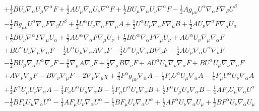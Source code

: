 \documentclass[10pt,letterpaper]{article}
\numberwithin{equation}{section}
\begin{document}
\begin{eqnarray}
&& + \tfrac{1}{2} B U_{\nu } \nabla_{\alpha }U_{\mu } \nabla^{\alpha }F + \tfrac{1}{2} A U_{\mu } \nabla_{\alpha }U_{\nu } \nabla^{\alpha }F + \tfrac{1}{2} B U_{\mu } \nabla_{\alpha }U_{\nu } \nabla^{\alpha }F -  \tfrac{1}{2} A g_{\mu \nu } U^{\alpha } \nabla_{\alpha }F \nabla_{\beta }U^{\beta } \nonumber \\ 
&& -  \tfrac{1}{2} B g_{\mu \nu } U^{\alpha } \nabla_{\alpha }F \nabla_{\beta }U^{\beta } + \tfrac{1}{2} U^{\alpha } U_{\nu } \nabla_{\alpha }F \nabla_{\mu }A + \tfrac{1}{2} U^{\alpha } U_{\nu } \nabla_{\alpha }F \nabla_{\mu }B + \tfrac{1}{2} A U_{\nu } \nabla^{\alpha }F \nabla_{\mu }U_{\alpha } \nonumber \\ 
&& + \tfrac{1}{2} B U_{\nu } \nabla^{\alpha }F \nabla_{\mu }U_{\alpha } + \tfrac{1}{2} A U^{\alpha } \nabla_{\alpha }F \nabla_{\mu }U_{\nu } + \tfrac{1}{2} B U^{\alpha } \nabla_{\alpha }F \nabla_{\mu }U_{\nu } + A U^{\alpha } U_{\nu } \nabla_{\mu }\nabla_{\alpha }F \nonumber \\ 
&& + B U^{\alpha } U_{\nu } \nabla_{\mu }\nabla_{\alpha }F -  \tfrac{1}{2} U^{\alpha } U_{\mu } \nabla_{\alpha }A \nabla_{\nu }F -  \tfrac{1}{2} U^{\alpha } U_{\mu } \nabla_{\alpha }B \nabla_{\nu }F -  \tfrac{1}{2} A U_{\mu } \nabla_{\alpha }U^{\alpha } \nabla_{\nu }F \nonumber \\ 
&& -  \tfrac{1}{2} B U_{\mu } \nabla_{\alpha }U^{\alpha } \nabla_{\nu }F -  \tfrac{1}{6} \nabla_{\mu }A \nabla_{\nu }F + \tfrac{1}{2} \nabla_{\mu }B \nabla_{\nu }F + A U^{\alpha } U_{\mu } \nabla_{\nu }\nabla_{\alpha }F + B U^{\alpha } U_{\mu } \nabla_{\nu }\nabla_{\alpha }F \nonumber \\ 
&& + A \nabla_{\nu }\nabla_{\mu }F -  B \nabla_{\nu }\nabla_{\mu }F - 2 \nabla_{\nu }\nabla_{\mu }\chi +\tfrac{2}{3} F^{\alpha } g_{\mu \nu } \nabla_{\alpha }A -  \tfrac{1}{4} F_{\nu } U^{\alpha } U_{\mu } \nabla_{\alpha }A -  \tfrac{1}{4} F_{\mu } U^{\alpha } U_{\nu } \nabla_{\alpha }A \nonumber \\ 
&& + \tfrac{1}{2} F^{\alpha } U_{\mu } U_{\nu } \nabla_{\alpha }A -  \tfrac{1}{4} F_{\nu } U^{\alpha } U_{\mu } \nabla_{\alpha }B -  \tfrac{1}{4} F_{\mu } U^{\alpha } U_{\nu } \nabla_{\alpha }B + \tfrac{1}{2} F^{\alpha } U_{\mu } U_{\nu } \nabla_{\alpha }B -  \tfrac{1}{4} A F_{\nu } U_{\mu } \nabla_{\alpha }U^{\alpha } \nonumber \\ 
&& -  \tfrac{1}{4} B F_{\nu } U_{\mu } \nabla_{\alpha }U^{\alpha } -  \tfrac{1}{4} A F_{\mu } U_{\nu } \nabla_{\alpha }U^{\alpha } -  \tfrac{1}{4} B F_{\mu } U_{\nu } \nabla_{\alpha }U^{\alpha } + \tfrac{1}{2} A F^{\alpha } U_{\nu } \nabla_{\alpha }U_{\mu } + \tfrac{1}{2} B F^{\alpha } U_{\nu } \nabla_{\alpha }U_{\mu } \nonumber \\ 

\end{eqnarray}
\end{document}
